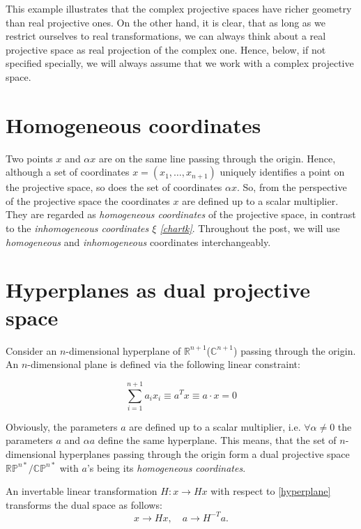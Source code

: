 \documentclass[a4paper,10pt]{article}
\begin{document}
This example illustrates that the complex projective spaces have richer geometry than real projective ones. On the other hand, it is clear, that as long as we restrict ourselves to real transformations, we can always think about a real projective space as real projection of the complex one. Hence, below, if not specified specially, we will always assume that we work with a complex projective space.

\section{Homogeneous coordinates}

Two points $x$ and $\alpha x$  are on the same line passing through the origin.  Hence, although a set of coordinates $x = (x_1, \ldots, x_{n+1})$ uniquely identifies a point on the projective space, so does the set of coordinates $\alpha x$. So, from the perspective of the projective space the coordinates $x$ are defined up to a scalar multiplier. They are regarded as {\it homogeneous coordinates} of the projective space, in contrast to the {\it inhomogeneous coordinates $\xi$ \eqref{chartk}}.  Throughout the post, we will use {\it homogeneous}  and {\it inhomogeneous} coordinates interchangeably.

\section{Hyperplanes as dual projective space}

Consider an $n$-dimensional hyperplane of $\mathbb{R}^{n+1}$($\mathbb{C}^{n+1}$) passing through the origin. An $n$-dimensional plane is defined via the following linear constraint:

\begin{equation}
 \sum\limits_{i=1}^{n+1} a_i x_i \equiv a^Tx \equiv a\cdot x = 0\label{hyperplane}
\end{equation}

Obviously, the parameters $a$ are defined up to a scalar multiplier, i.e. $\forall\alpha\neq 0$ the parameters $a$ and $\alpha a$ define the same hyperplane. This means, that the set of $n$-dimensional hyperplanes passing through the origin form a dual projective space $\mathbb{RP}^{n*}/\mathbb{CP}^{n*}$ with $a$'s being its {\it homogeneous coordinates}. 

An invertable linear transformation $H: x \to H x$ with respect to \eqref{hyperplane} transforms the dual space as follows:
\begin{equation}
 x\to Hx, \quad a\to H^{-T} a.
\end{equation}
\end{document}
